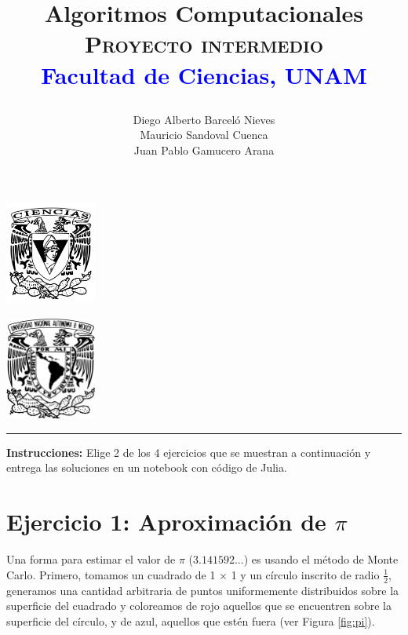 \documentclass[a4paper,12pt]{article}
\begin{document}
\title{
\textbf {Algoritmos Computacionales}\\ \textsc{Proyecto intermedio}\\
\textcolor{Blue}{Facultad de Ciencias, UNAM}
\author{
Diego Alberto Barceló Nieves\\
Mauricio Sandoval Cuenca\\
Juan Pablo Gamucero Arana
}
\date{}
}
\begin{minipage}[left]{3cm}
\includegraphics[width=3cm]{img/EscudoCiencias.png}
\end{minipage}
\begin{minipage}[c]{11.8cm}
\maketitle
\end{minipage}
\begin{minipage}[right]{3cm}
\includegraphics[width=3cm]{img/escudoUNAM.png}
\end{minipage}
{\color{gray}\hrule} 

\textbf{Instrucciones:}
Elige 2 de los 4 ejercicios que se muestran a continuación y entrega las soluciones en un notebook con código de Julia. 

\section*{Ejercicio 1: Aproximación de $\pi$}

Una forma para estimar el valor de $\pi$ ($3.141592...$) es usando el método de Monte Carlo. Primero, tomamos un cuadrado de 1 $\times$ 1 y un círculo inscrito de radio $\frac{1}{2}$, generamos una cantidad arbitraria de puntos uniformemente distribuidos sobre la superficie del cuadrado y coloreamos de rojo aquellos que se encuentren sobre la superficie del círculo, y de azul, aquellos que estén fuera  (ver Figura \ref{fig:pi}).
\end{document}
